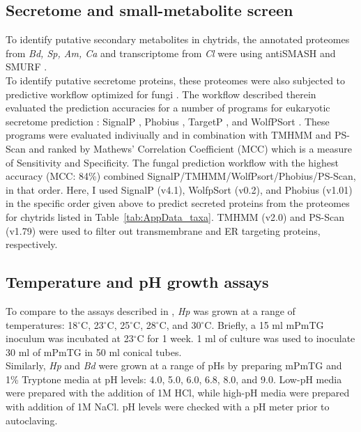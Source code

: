 \subsection*{Secretome and small-metabolite screen}
To identify putative secondary metabolites in chytrids, the annotated proteomes from \textit{Bd, Sp, Am, Ca} and transcriptome from \textit{Cl} were using antiSMASH \cite{Blin2013} and SMURF \cite{Khaldi2010}.\\
\indent To identify putative secretome proteins, these proteomes were also subjected to 
predictive workflow optimized for fungi \cite{Min2010}. The workflow described therein 
evaluated the prediction accuracies for a number of programs for eukaryotic secretome prediction : 
SignalP \cite{Bendtsen2004}, Phobius \cite{Kall2004,Kall2007}, TargetP 
\cite{Emanuelsson2000,Emanuelsson2007}, and WolfPSort \cite{Sprenger2006,Horton2007}. 
These programs were evaluated indiviually and in combination with TMHMM \cite{Krogh2001} and PS-Scan 
\cite{deCastro2006} and ranked by Mathews' Correlation Coefficient (MCC) \cite{Matthews1975,Baldi2000,Menne2000} 
which is a measure of Sensitivity and Specificity. The fungal prediction workflow with 
the highest accuracy (MCC: 84\%) combined SignalP/TMHMM/WolfPsort/Phobius/PS-Scan, in that order. 
Here, I used SignalP (v4.1), WolfpSort (v0.2), and Phobius (v1.01) in the specific order given above to predict secreted proteins from 
the proteomes for chytrids listed in Table~\ref{tab:AppData_taxa}. TMHMM (v2.0) and PS-Scan (v1.79) were 
used to filter out transmembrane and ER targeting proteins, respectively.\\ 
\subsection*{Temperature and pH growth assays}
To compare to the assays described in \cite{Piotrowski2004}, \textit{Hp} was grown at a range of temperatures: 18$^{\circ}$C, 23$^{\circ}$C, 25$^{\circ}$C, 28$^{\circ}$C, and 30$^{\circ}$C. Briefly, a 15 ml mPmTG inoculum was incubated at 23$^{\circ}$C for 1 week. 1 ml of culture was used to inoculate 30 ml of mPmTG in 50 ml conical tubes. \\
\indent Similarly, \textit{Hp} and \textit{Bd} were grown at a range of pHs by preparing mPmTG and 1\% Tryptone media at pH levels: 4.0, 5.0, 6.0, 6.8, 8.0, and 9.0. Low-pH media were prepared with the addition of 1M HCl, while high-pH media were prepared with addition of 1M NaCl. pH levels were checked with a pH meter prior to autoclaving.\\
